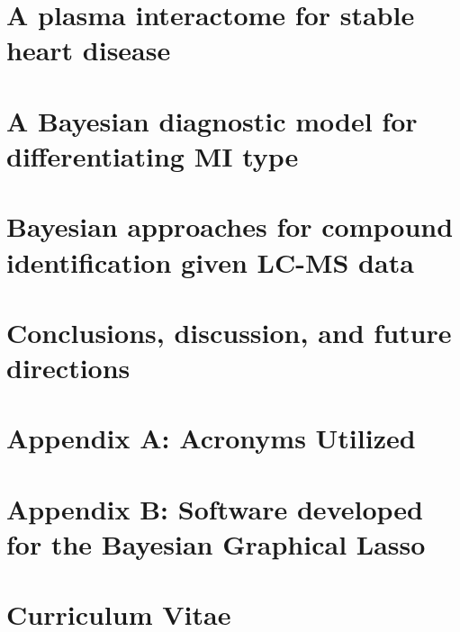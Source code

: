 \documentclass[final]{ulthesis}
\begin{document}
\chapter{A plasma interactome for stable heart disease}


\chapter{A Bayesian diagnostic model for differentiating MI type}


\chapter{Bayesian approaches for compound identification given LC-MS data}


\chapter{Conclusions, discussion, and future directions} 


\backmatter
\begin{DoubleSpace*}


%
%


\end{DoubleSpace*}

\chapter{Appendix A: Acronyms Utilized}


\chapter{Appendix B: Software developed for the Bayesian Graphical Lasso}


\chapter{Curriculum Vitae}
\begin{DoubleSpace*}

\end{DoubleSpace*}
\end{document}
